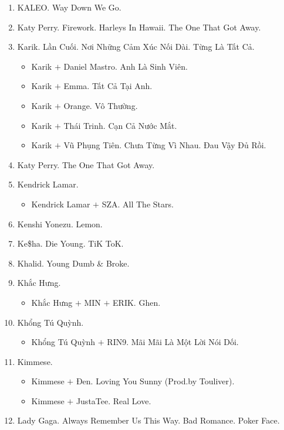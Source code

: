\documentclass{article}
\begin{document}
\begin{enumerate}
\begin{itemize}
		\item {\sc K-391 $+$ R{\O}RY.} Aurora.
	\end{itemize}
	\item {\sc KALEO.} Way Down We Go.
	\item {\sc Katy Perry.} Firework. Harleys In Hawaii. The One That Got Away.
	\item {\sc Karik.} Lần Cuối. Nơi Những Cảm Xúc Nối Dài. Từng Là Tất Cả.
	\begin{itemize}
		\item {\sc Karik $+$ Daniel Mastro.} Anh Là Sinh Viên.
		\item {\sc Karik $+$ Emma.} Tất Cả Tại Anh.
		\item {\sc Karik $+$ Orange.} Vô Thường.
		\item {\sc Karik $+$ Thái Trinh.} Cạn Cả Nước Mắt.
		\item {\sc Karik $+$ Vũ Phụng Tiên.} Chưa Từng Vì Nhau. Đau Vậy Đủ Rồi.
	\end{itemize}
	\item {\sc Katy Perry.} The One That Got Away.
	\item {\sc Kendrick Lamar.}
	\begin{itemize}
		\item {\sc Kendrick Lamar $+$ SZA.} All The Stars.
	\end{itemize}
	\item {\sc Kenshi Yonezu.} Lemon.
	\item {\sc Ke\$ha.} Die Young. TiK ToK.
	\item {\sc Khalid.} Young Dumb \& Broke.
	\item {\sc Khắc Hưng.}
	\begin{itemize}
		\item {\sc Khắc Hưng $+$ MIN $+$ ERIK.} Ghen.
	\end{itemize}
	\item {\sc Khổng Tú Quỳnh.}
	\begin{itemize}
		\item {\sc Khổng Tú Quỳnh $+$ RIN9.} Mãi Mãi Là Một Lời Nói Dối.
	\end{itemize}
	\item {\sc Kimmese.}
	\begin{itemize}
		\item {\sc Kimmese $+$ Đen.} Loving You Sunny (Prod.by Touliver).
		\item {\sc Kimmese $+$ JustaTee.} Real Love.
	\end{itemize}
	\item {\sc Lady Gaga.} Always Remember Us This Way. Bad Romance. Poker Face.

\end{enumerate}
\end{document}
